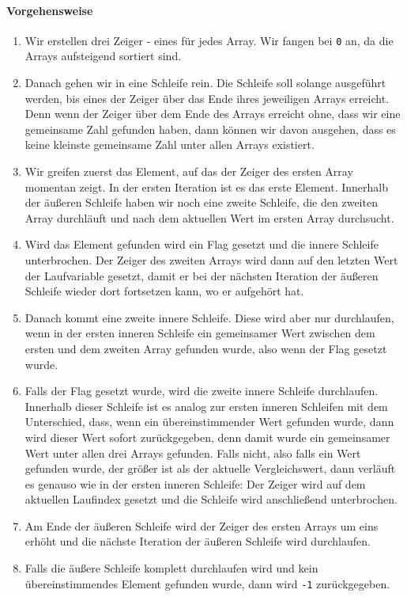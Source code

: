 \documentclass[babel]{book}
\begin{document}
\paragraph{Vorgehensweise}
\begin{enumerate}
	\item Wir erstellen drei Zeiger - eines für jedes Array. Wir fangen bei \lstinline|0| an, da die Arrays aufsteigend sortiert sind.
	\item Danach gehen wir in eine Schleife rein. Die Schleife soll solange ausgeführt werden, bis eines der Zeiger über das Ende ihres jeweiligen Arrays erreicht. Denn wenn der Zeiger über dem Ende des Arrays erreicht ohne, dass wir eine gemeinsame Zahl gefunden haben, dann können wir davon ausgehen, dass es keine kleinste gemeinsame Zahl unter allen Arrays existiert.
	\item Wir greifen zuerst das Element, auf das der Zeiger des ersten Array momentan zeigt. In der ersten Iteration ist es das erste Element. Innerhalb der äußeren Schleife haben wir noch eine zweite Schleife, die den zweiten Array durchläuft und nach dem aktuellen Wert im ersten Array durchsucht. 
	\item Wird das Element gefunden wird ein Flag gesetzt und die innere Schleife unterbrochen. Der Zeiger des zweiten Arrays wird dann auf den letzten Wert der Laufvariable gesetzt, damit er bei der nächsten Iteration der äußeren Schleife wieder dort fortsetzen kann, wo er aufgehört hat.
	\item Danach kommt eine zweite innere Schleife. Diese wird aber nur durchlaufen, wenn in der ersten inneren Schleife ein gemeinsamer Wert zwischen dem ersten und dem zweiten Array gefunden wurde, also wenn der Flag gesetzt wurde.
	\item Falls der Flag gesetzt wurde, wird die zweite innere Schleife durchlaufen. Innerhalb dieser Schleife ist es analog zur ersten inneren Schleifen mit dem Unterschied, dass, wenn ein übereinstimmender Wert gefunden wurde, dann wird dieser Wert sofort zurückgegeben, denn damit wurde ein gemeinsamer Wert unter allen drei Arrays gefunden. Falls nicht, also falls ein Wert gefunden wurde, der größer ist als der aktuelle Vergleichswert, dann verläuft es genauso wie in der ersten inneren Schleife: Der Zeiger wird auf dem aktuellen Laufindex gesetzt und die Schleife wird anschließend unterbrochen.
	\item Am Ende der äußeren Schleife wird der Zeiger des ersten Arrays um eins erhöht und die nächste Iteration der äußeren Schleife wird durchlaufen.
	\item Falls die äußere Schleife komplett durchlaufen wird und kein übereinstimmendes Element gefunden wurde, dann wird \lstinline|-1| zurückgegeben.	
\end{enumerate}
\end{document}

